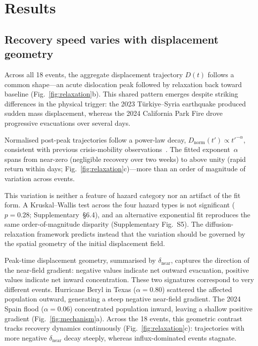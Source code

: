 \documentclass[11pt]{article}
\newcommand{\dnear}{\delta_{\mathrm{near}}}
\newcommand{\Dnorm}{D_{\mathrm{norm}}}
\begin{document}
\section*{Results}

\subsection*{Recovery speed varies with displacement geometry}

Across all 18 events, the aggregate displacement trajectory $D(t)$ follows a common shape---an acute dislocation peak followed by relaxation back toward baseline (Fig.~\ref{fig:relaxation}b). This shared pattern emerges despite striking differences in the physical trigger: the 2023 T\"{u}rkiye--Syria earthquake produced sudden mass displacement, whereas the 2024 California Park Fire drove progressive evacuations over several days.

Normalised post-peak trajectories follow a power-law decay, $\Dnorm(t') \propto t'^{-\alpha}$, consistent with previous crisis-mobility observations~\citep{Li2022}. The fitted exponent~$\alpha$ spans from near-zero (negligible recovery over two weeks) to above unity (rapid return within days; Fig.~\ref{fig:relaxation}c)---more than an order of magnitude of variation across events.

This variation is neither a feature of hazard category nor an artifact of the fit form. A Kruskal--Wallis test across the four hazard types is not significant ($p = 0.28$; Supplementary~\S6.4), and an alternative exponential fit reproduces the same order-of-magnitude disparity (Supplementary Fig.~S5). The diffusion-relaxation framework predicts instead that the variation should be governed by the spatial geometry of the initial displacement field.

Peak-time displacement geometry, summarised by $\dnear$, captures the direction of the near-field gradient: negative values indicate net outward evacuation, positive values indicate net inward concentration. These two signatures correspond to very different events. Hurricane Beryl in Texas ($\alpha = 0.80$) scattered the affected population outward, generating a steep negative near-field gradient. The 2024 Spain flood ($\alpha = 0.06$) concentrated population inward, leaving a shallow positive gradient (Fig.~\ref{fig:mechanism}a). Across the 18 events, this geometric contrast tracks recovery dynamics continuously (Fig.~\ref{fig:relaxation}c): trajectories with more negative $\dnear$ decay steeply, whereas influx-dominated events stagnate.
\end{document}
